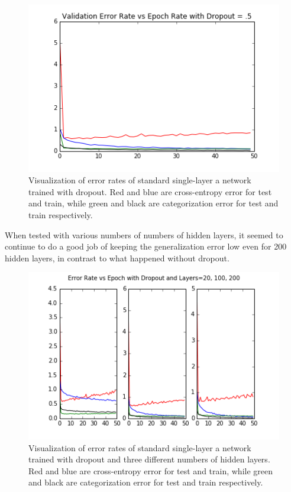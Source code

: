 \documentclass{article}
\begin{document}
\begin{figure}[h]
  \centering
  \includegraphics[scale=0.6]{../dropout1.png} 
  \caption{Visualization of error rates of standard single-layer a network trained with dropout. Red and blue are cross-entropy error for test and train, while green and black are categorization error for test and train respectively. }
  \label{fig:dropout1}
\end{figure}

When tested with various numbers of numbers of hidden layers, it seemed to continue to do a good job of keeping the generalization error low even for 200 hidden layers, in contrast to what happened without dropout.  

\begin{figure}[h]
  \centering
  \includegraphics[scale=0.6]{../dropout_layers.png} 
  \caption{Visualization of error rates of standard single-layer a network trained with dropout and three different numbers of hidden layers. Red and blue are cross-entropy error for test and train, while green and black are categorization error for test and train respectively. }
  \label{fig:dropout1}
\end{figure}
\end{document}

